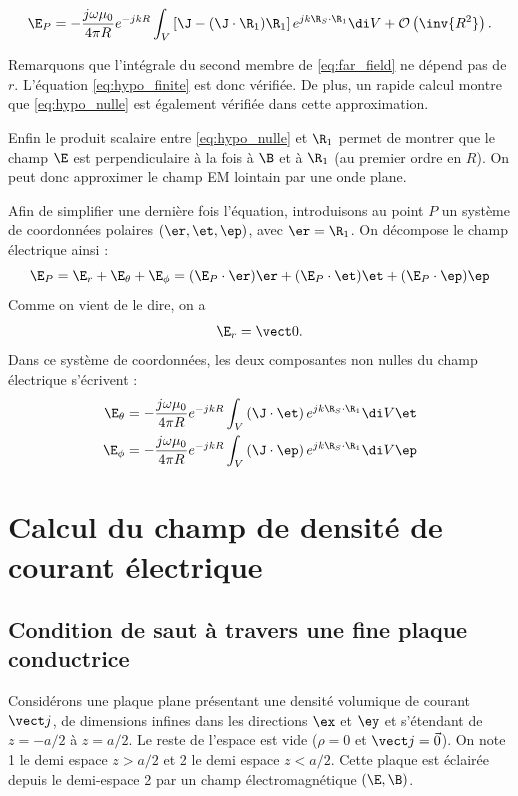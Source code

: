 \begin{equation}
	\label{eq:far_field}
	\E_P = -\frac{j\omega\mu_0}{4\pi R}e^{-jkR}\int_V\left[\J-(\J\cdot\R_1)\R_1\right]
	e^{jk\R_S\cdot\R_1}\di V + \mathcal O\left(\inv{R^2}\right).
\end{equation}

Remarquons que l'intégrale du second membre de \eqref{eq:far_field} ne dépend pas de $r$. L'équation \eqref{eq:hypo_finite} est donc vérifiée. De plus, un rapide calcul montre que \eqref{eq:hypo_nulle} est également vérifiée dans cette approximation. 

Enfin le produit scalaire entre \eqref{eq:hypo_nulle} et $\R_1$ permet de montrer que le champ $\E$ est perpendiculaire à la fois à $\B$ et à $\R_1$ (au premier ordre en $R$). On peut donc approximer le champ EM lointain par une onde plane.

Afin de simplifier une dernière fois l'équation, introduisons au point $P$ un système de coordonnées polaires $\left(\er,\et,\ep\right)$, avec $\er = \R_1$. On décompose le champ électrique ainsi : $$\E_P = \E_r+\E_\theta+\E_\phi = (\E_P\cdot\er)\er + (\E_P\cdot\et)\et +(\E_P\cdot\ep)\ep$$Comme on vient de le dire, on a $$\E_r = \vect 0.$$ Dans ce système de coordonnées, les deux composantes non nulles du champ électrique s'écrivent :
\begin{subequations}
	\begin{align}
			\E_\theta &= -\frac{j\omega\mu_0}{4\pi R}e^{-jkR}\int_V\left(\J\cdot\et\right)
				e^{jk\R_S\cdot\R_1}\di V \et\\
			\E_\phi &= -\frac{j\omega\mu_0}{4\pi R}e^{-jkR}\int_V\left(\J\cdot\ep\right)
				e^{jk\R_S\cdot\R_1}\di V \ep
	\end{align}
\end{subequations}

\section[Courant électrique]{Calcul du champ de densité de courant électrique}
	\subsection{Condition de saut à travers une fine plaque conductrice}

Considérons une plaque plane présentant une densité volumique de courant $\vect j$, de dimensions infines dans les directions $\ex$ et $\ey$ et s'étendant de $z = -a/2$ à $z = a/2$. Le reste de l'espace est vide ($\rho = 0$ et $\vect j = \vec0$). On note 1 le demi espace $z > a/ 2$ et 2 le demi espace $z < a/2$. Cette plaque est éclairée depuis le demi-espace 2 par un champ électromagnétique $(\E,\B)$.


